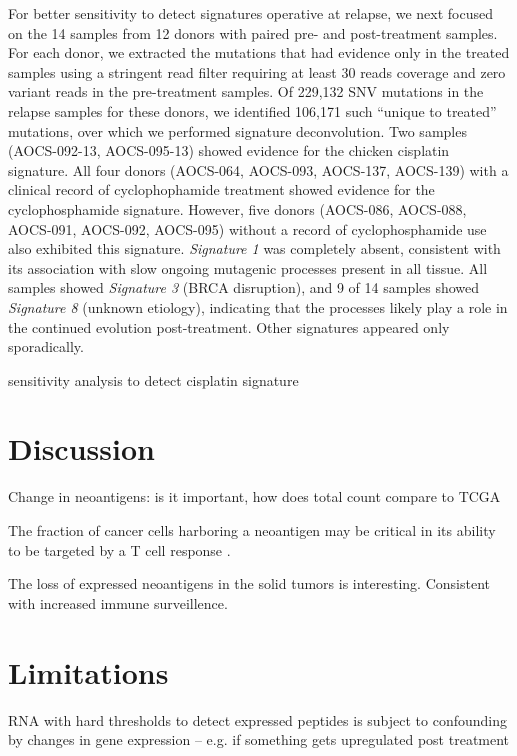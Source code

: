 For better sensitivity to detect signatures operative at relapse, we next focused on the 14 samples from 12 donors with paired pre- and post-treatment samples. For each donor, we extracted the mutations that had evidence only in the treated samples using a stringent read filter requiring at least 30 reads coverage and zero variant reads in the pre-treatment samples. Of 229,132 SNV mutations in the relapse samples for these donors, we identified 106,171 such ``unique to treated'' mutations, over which we performed signature deconvolution. Two samples (AOCS-092-13, AOCS-095-13) showed evidence for the chicken cisplatin signature. All four donors (AOCS-064, AOCS-093, AOCS-137, AOCS-139) with a clinical record of cyclophophamide treatment showed evidence for the cyclophosphamide signature. However, five donors (AOCS-086, AOCS-088, AOCS-091, AOCS-092, AOCS-095) without a record of cyclophosphamide use also exhibited this signature. \textit{Signature 1} was completely absent, consistent with its association with slow ongoing mutagenic processes present in all tissue. All samples showed \textit{Signature 3} (BRCA disruption), and 9 of 14 samples showed \textit{Signature 8} (unknown etiology), indicating that the processes likely play a role in the continued evolution post-treatment. Other signatures appeared only sporadically.

sensitivity analysis to detect cisplatin signature



\section*{Discussion}

Change in neoantigens: is it important, how does total count compare to TCGA

The fraction of cancer cells harboring a neoantigen may be critical in its ability to be targeted by a T cell response \cite{McGranahan_2016}.

The loss of expressed neoantigens in the solid tumors is interesting. Consistent with increased immune surveillence.



\section*{Limitations}
RNA with hard thresholds to detect expressed peptides is subject to confounding by changes in gene expression -- e.g. if something gets upregulated post treatment

